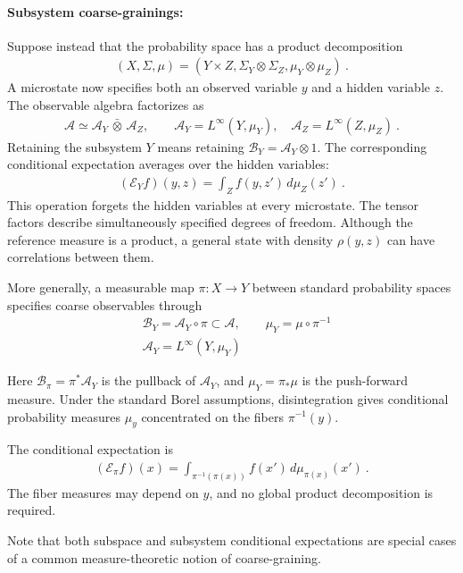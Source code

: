 \documentclass[a4paper,11pt]{article}
\theoremstyle{definition}
\newcommand{\mA}{\mathcal{A}}
\newcommand{\mB}{\mathcal{B}}
\newcommand{\nn}{\nonumber}
\begin{document}
\paragraph{Subsystem coarse-grainings:}
Suppose instead that the probability space has a product decomposition
\begin{align}
    (X,\Sigma,\mu)=(Y\times Z,\Sigma_Y\otimes\Sigma_Z,\mu_Y\otimes\mu_Z)\ .
\end{align}
A microstate now specifies both an observed variable $y$ and a hidden variable $z$. The observable algebra factorizes as
\begin{align}
    \mA\simeq\mA_Y\,\bar\otimes\,\mA_Z,
    \qquad \mA_Y=L^\infty(Y,\mu_Y),\quad
    \mA_Z=L^\infty(Z,\mu_Z)\ .
\end{align}
Retaining the subsystem $Y$ means retaining $\mB_Y=\mA_Y\otimes 1$. The corresponding conditional expectation averages over the hidden variables:
\begin{align}
    (\mathcal{E}_Y f)(y,z)=\int_Z f(y,z')\,d\mu_Z(z')\ .
\end{align}
This operation forgets the hidden variables at every microstate. The tensor factors describe simultaneously specified degrees of freedom. Although the reference measure is a product, a general state with density $\rho(y,z)$ can have correlations between them. 

More generally, a measurable map $\pi:X\to Y$ between standard probability spaces specifies coarse observables through
\begin{align}
    &\mB_Y=\mA_Y\circ \pi\subset \mA,
    \qquad \mu_Y=\mu\circ \pi^{-1}\nn\\
    &\mA_Y=L^\infty(Y,\mu_Y)
\end{align}

Here $\mB_\pi=\pi^*\mA_Y$ is the pullback of $\mA_Y$, and $\mu_Y=\pi_*\mu$ is the
push-forward measure. Under the standard Borel assumptions, disintegration gives
conditional probability measures $\mu_y$ concentrated on the fibers $\pi^{-1}(y)$.

The conditional expectation is
\begin{align}
    (\mathcal{E}_\pi f)(x)=\int_{\pi^{-1}(\pi(x))}f(x')\,d\mu_{\pi(x)}(x')\ .
\end{align}
The fiber measures may depend on $y$, and no global product decomposition is required. 

Note that both subspace and subsystem conditional expectations are special cases of a common measure-theoretic notion of coarse-graining.
\end{document}
